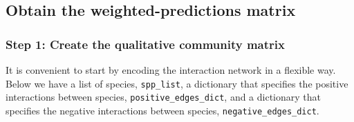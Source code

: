 \documentclass[11pt]{article}
\begin{document}
    \subsection{Obtain the weighted-predictions
matrix}\label{obtain-the-weighted-predictions-matrix}

\subsubsection{Step 1: Create the qualitative community
matrix}\label{step-1-create-the-qualitative-community-matrix}

It is convenient to start by encoding the interaction network in a
flexible way. Below we have a list of species, \texttt{spp\_list}, a
dictionary that specifies the positive interactions between species,
\texttt{positive\_edges\_dict}, and a dictionary that specifies the
negative interactions between species, \texttt{negative\_edges\_dict}.
\end{document}
